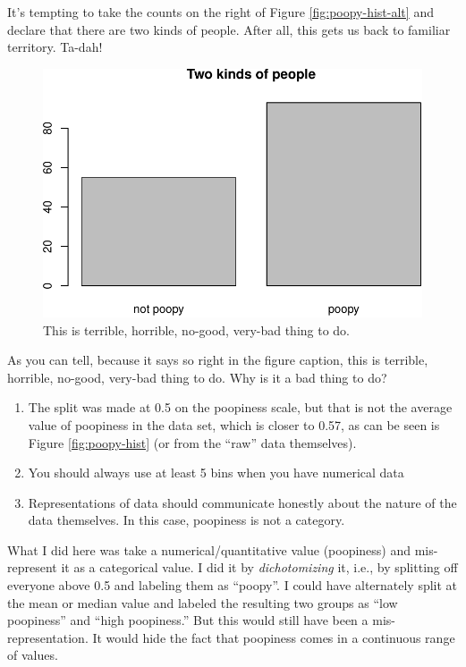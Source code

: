 \documentclass[]{book}
\providecommand{\tightlist}{%
  \setlength{\itemsep}{0pt}\setlength{\parskip}{0pt}}
\begin{document}
It's tempting to take the counts on the right of Figure \ref{fig:poopy-hist-alt} and declare that there are two kinds of people. After all, this gets us back to familiar territory. Ta-dah!

\begin{figure}
\centering
\includegraphics{bigquestions-book_files/figure-latex/poopy-two-kinds-1.pdf}
\caption{\label{fig:poopy-two-kinds}This is terrible, horrible, no-good, very-bad thing to do.}
\end{figure}

As you can tell, because it says so right in the figure caption, this is terrible, horrible, no-good, very-bad thing to do. Why is it a bad thing to do?

\begin{enumerate}
\def\labelenumi{\alph{enumi})}
\tightlist
\item
  The split was made at 0.5 on the poopiness scale, but that is not the average value of poopiness in the data set, which is closer to 0.57, as can be seen is Figure \ref{fig:poopy-hist} (or from the ``raw'' data themselves).
\item
  You should always use at least 5 bins when you have numerical data
\item
  Representations of data should communicate honestly about the nature of the data themselves. In this case, poopiness is not a category.
\end{enumerate}

What I did here was take a numerical/quantitative value (poopiness) and mis-represent it as a categorical value. I did it by \emph{dichotomizing} it, i.e., by splitting off everyone above 0.5 and labeling them as ``poopy''. I could have alternately split at the mean or median value and labeled the resulting two groups as ``low poopiness'' and ``high poopiness.'' But this would still have been a mis-representation. It would hide the fact that poopiness comes in a continuous range of values.
\end{document}
